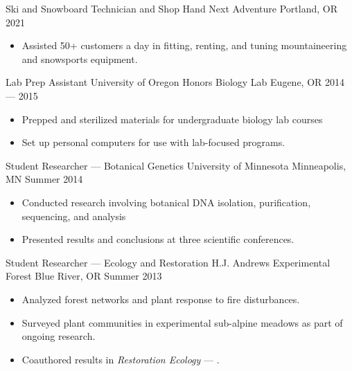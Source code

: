 \showoff
{Ski and Snowboard Technician and Shop Hand}
{Next Adventure}
{Portland, OR}
{2021}
\begin{itemize}[label=$\triangleright$]
    \item Assisted 50+ customers a day in fitting, renting, and tuning mountaineering and snowsports equipment.
\end{itemize}

\myBreak

\showoff
{Lab Prep Assistant}
{University of Oregon Honors Biology Lab}
{Eugene, OR}
{2014 --- 2015}
\begin{itemize}[label=$\triangleright$]
    \item Prepped and sterilized materials for undergraduate biology lab courses
    \item Set up personal computers for use with lab-focused programs.
\end{itemize}

\myBreak

\showoff
{Student Researcher --- Botanical Genetics}
{University of Minnesota}
{Minneapolis, MN}
{Summer 2014}
\begin{itemize}[label=$\triangleright$]
    \item Conducted research involving botanical DNA isolation, purification, sequencing, and analysis
    \item Presented results and conclusions at three scientific conferences.
\end{itemize}

\myBreak

\showoff
{Student Researcher --- Ecology and Restoration}
{H.J. Andrews Experimental Forest}
{Blue River, OR}
{Summer 2013}
\begin{itemize}[label=$\triangleright$]
    \item Analyzed forest networks and plant response to fire disturbances.
    \item Surveyed plant communities in experimental sub-alpine meadows as part of ongoing research.
    \item Coauthored results in \emph{Restoration Ecology} --- .
\end{itemize}

